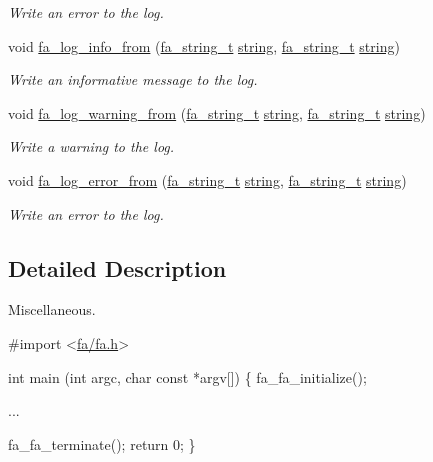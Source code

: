 \begin{DoxyCompactItemize}
\begin{DoxyCompactList}\small\item\em Write an error to the log. \end{DoxyCompactList}\item 
void \hyperlink{group___fa_fa_ga55b72d122d0f431040d62b1d83439f3d}{fa\-\_\-log\-\_\-info\-\_\-from} (\hyperlink{group___fa_string_gacada63033b77bc6c39fa632ae199349b}{fa\-\_\-string\-\_\-t} \hyperlink{util_8h_a41106000aac73b61e4fc2ef9dd39a603}{string}, \hyperlink{group___fa_string_gacada63033b77bc6c39fa632ae199349b}{fa\-\_\-string\-\_\-t} \hyperlink{util_8h_a41106000aac73b61e4fc2ef9dd39a603}{string})
\begin{DoxyCompactList}\small\item\em Write an informative message to the log. \end{DoxyCompactList}\item 
void \hyperlink{group___fa_fa_ga2f32e1c021f5d231779a9b039547553b}{fa\-\_\-log\-\_\-warning\-\_\-from} (\hyperlink{group___fa_string_gacada63033b77bc6c39fa632ae199349b}{fa\-\_\-string\-\_\-t} \hyperlink{util_8h_a41106000aac73b61e4fc2ef9dd39a603}{string}, \hyperlink{group___fa_string_gacada63033b77bc6c39fa632ae199349b}{fa\-\_\-string\-\_\-t} \hyperlink{util_8h_a41106000aac73b61e4fc2ef9dd39a603}{string})
\begin{DoxyCompactList}\small\item\em Write a warning to the log. \end{DoxyCompactList}\item 
void \hyperlink{group___fa_fa_ga32c5a84cef2ffc742b7adade29cd83a5}{fa\-\_\-log\-\_\-error\-\_\-from} (\hyperlink{group___fa_string_gacada63033b77bc6c39fa632ae199349b}{fa\-\_\-string\-\_\-t} \hyperlink{util_8h_a41106000aac73b61e4fc2ef9dd39a603}{string}, \hyperlink{group___fa_string_gacada63033b77bc6c39fa632ae199349b}{fa\-\_\-string\-\_\-t} \hyperlink{util_8h_a41106000aac73b61e4fc2ef9dd39a603}{string})
\begin{DoxyCompactList}\small\item\em Write an error to the log. \end{DoxyCompactList}\end{DoxyCompactItemize}


\subsection{Detailed Description}
Miscellaneous. 
\begin{DoxyCode}
\textcolor{preprocessor}{#import <\hyperlink{fa_2fa_8h}{fa/fa.h}>}

\textcolor{keywordtype}{int} main (\textcolor{keywordtype}{int} argc, \textcolor{keywordtype}{char} \textcolor{keyword}{const} *argv[])
\{
    fa\_fa\_initialize();

    ...

    fa\_fa\_terminate();
    \textcolor{keywordflow}{return} 0;
\}
\end{DoxyCode}
 

